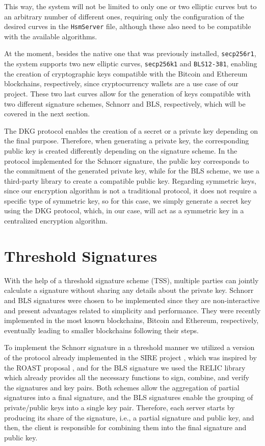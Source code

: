 This way, the system will not be limited to only one or two elliptic curves but to an arbitrary number of different ones, requiring only the configuration of the desired curves in the \texttt{HsmServer} file, although these also need to be compatible with the available algorithms.

At the moment, besides the native one that was previously installed, \texttt{secp256r1}, the system supports two new elliptic curves, \texttt{secp256k1} and \texttt{BLS12-381}, enabling the creation of cryptographic keys compatible with the Bitcoin and Ethereum blockchains, respectively, since cryptocurrency wallets are a use case of our project. These two last curves allow for the generation of keys compatible with two different signature schemes, Schnorr and BLS, respectively, which will be covered in the next section. 

The DKG protocol enables the creation of a secret or a private key depending on the final purpose. Therefore, when generating a private key, the corresponding public key is created differently depending on the signature scheme. In the protocol implemented for the Schnorr signature, the public key corresponds to the commitment of the generated private key, while for the BLS scheme, we use a third-party library to create a compatible public key. Regarding symmetric keys, since our encryption algorithm is not a traditional protocol, it does not require a specific type of symmetric key, so for this case, we simply generate a secret key using the DKG protocol, which, in our case, will act as a symmetric key in a centralized encryption algorithm. 

\section{Threshold Signatures} \label{sec:thresholdsignatures}

With the help of a threshold signature scheme (TSS), multiple parties can jointly calculate a signature without sharing any details about the private key. Schnorr and BLS signatures were chosen to be implemented since they are non-interactive and present advantages related to simplicity and performance. They were recently implemented in the most known blockchains, Bitcoin and Ethereum, respectively, eventually leading to smaller blockchains following their steps.

To implement the Schnorr signature \cite{schnorrnotes} in a threshold manner we utilized a version of the protocol already implemented in the SIRE project \cite{siregithub}, which was inspired by the ROAST proposal \cite{frost3}, and for the BLS signature \cite{blsdraft} we used the RELIC library \cite{relicgithub} which already provides all the necessary functions to sign, combine, and verify the signatures and key pairs. Both schemes allow the aggregation of partial signatures into a final signature, and the BLS signatures enable the grouping of private/public keys into a single key pair. Therefore, each server starts by producing its share of the signature, i.e., a partial signature and public key, and then, the client is responsible for combining them into the final signature and public key.

